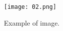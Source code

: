 \documentclass[10pt,twocolumn,letterpaper]{article}
\begin{document}
\begin{figure}[H]
\begin{center}
\texttt{[image: 02.png]}
\end{center}
   \caption{Example of image.}
\end{figure}




{\small


}
\end{document}
